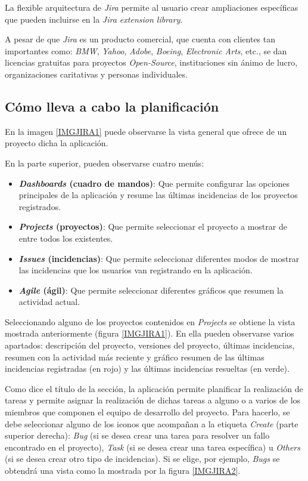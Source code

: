 \documentclass[11pt,a4paper,spanish,twoside]{report}
\begin{document}
	La flexible arquitectura de \emph{Jira} permite al usuario crear ampliaciones
	específicas que pueden incluirse en la \emph{Jira extension library}.

	A pesar de que \emph{Jira} es un producto comercial, que cuenta con clientes
	tan	importantes como: \emph{BMW}, \emph{Yahoo}, \emph{Adobe}, \emph{Boeing},
	\emph{Electronic Arts}, etc., se dan licencias gratuitas para proyectos
	\emph{Open-Source}, instituciones sin ánimo de lucro, organizaciones
	caritativas y personas individuales.

	\subsection{Cómo lleva a cabo la planificación}
	En la imagen \ref{IMGJIRA1} puede observarse la vista general que ofrece de
	un proyecto dicha la aplicación.


	En la parte superior, pueden observarse cuatro menús:
	\begin{itemize}
		\item \textbf{\emph{Dashboards} (cuadro de mandos)}: Que permite configurar
		las opciones principales de la aplicación y resume las últimas incidencias
		de los proyectos registrados.
		\item \textbf{\emph{Projects} (proyectos)}: Que permite seleccionar el
		proyecto a mostrar de entre todos los existentes.
		\item \textbf{\emph{Issues} (incidencias)}: Que permite seleccionar
		diferentes modos de mostrar las incidencias que los usuarios van
		registrando en la aplicación.
		\item \textbf{\emph{Agile} (ágil)}: Que permite seleccionar diferentes
		gráficos que resumen la actividad actual.
	\end{itemize}
	Seleccionando alguno de los proyectos contenidos en \emph{Projects} se
	obtiene la vista mostrada anteriormente (figura \ref{IMGJIRA1}).
	En ella pueden observarse varios apartados: descripción del
	proyecto, versiones del proyecto, últimas incidencias, resumen con la
	actividad más reciente y gráfico resumen de las últimas incidencias
	registradas (en rojo) y las	últimas incidencias resueltas (en verde).

	Como dice el título de la sección, la aplicación permite planificar la
	realización de tareas y permite asignar la realización de dichas tareas
	a alguno o a varios de los miembros que componen el equipo de desarrollo
	del proyecto. Para hacerlo, se debe seleccionar alguno de los iconos que
	acompañan a la etiqueta \emph{Create} (parte superior derecha):
	\emph{Bug} (si se desea crear una tarea para resolver un fallo encontrado
	en el proyecto), \emph{Task} (si se desea crear una tarea específica) u
	\emph{Others} (si se desea crear otro tipo de incidencias).
	Si se elige, por ejemplo, \emph{Bugs} se obtendrá una vista como la mostrada
	por la figura \ref{IMGJIRA2}.
	
\end{document}
